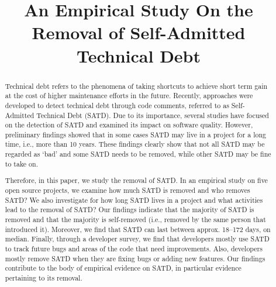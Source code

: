 \documentclass[10pt, conference]{IEEEtran}
\begin{document}
	
\title{An Empirical Study On the Removal of Self-Admitted Technical Debt}



\author{
}



\maketitle
\begin{abstract}
Technical debt refers to the phenomena of taking shortcuts to achieve short term gain at the cost of higher maintenance efforts in the future. Recently, approaches were developed to detect technical debt through code comments, referred to as Self-Admitted Technical Debt (SATD). Due to its importance, several studies have focused on the detection of SATD and examined its impact on software quality. However, preliminary findings showed that in some cases SATD may live in a project for a long time, i.e., more than 10 years. These findings clearly show that not all SATD may be regarded as `bad' and some SATD needs to be removed, while other SATD may be fine to take on.

Therefore, in this paper, we study the removal of SATD. In an empirical study on five open source projects, we examine how much SATD is removed and who removes SATD? We also investigate for how long SATD lives in a project and what activities lead to the removal of SATD? Our findings indicate that the majority of SATD is removed and that the majority is self-removed (i.e., removed by the same person that introduced it). Moreover, we find that SATD can last between approx. 18--172 days, on median. Finally, through a developer survey, we find that developers mostly use SATD to track future bugs and areas of the code that need improvements. Also, developers mostly remove SATD when they are fixing bugs or adding new features. Our findings contribute to the body of empirical evidence on SATD, in particular evidence pertaining to its removal.
\end{abstract}
\end{document}
